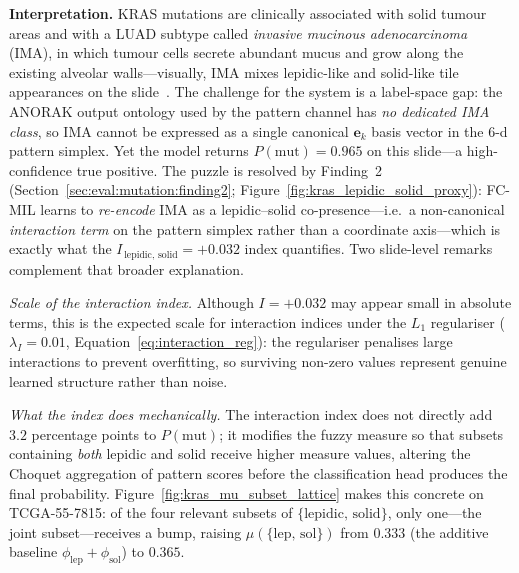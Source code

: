\textbf{Interpretation.}
KRAS mutations are clinically associated with solid tumour areas
and with a LUAD subtype called
\emph{invasive mucinous adenocarcinoma} (IMA), in which tumour
cells secrete abundant mucus and grow along the existing
alveolar walls---visually, IMA mixes lepidic-like and solid-like
tile appearances on the slide~\cite{shim2015krasmucinous}.
The challenge for the system is a label-space gap: the ANORAK
output ontology used by the pattern channel has \emph{no
dedicated IMA class}, so IMA cannot be expressed as a single
canonical $\mathbf{e}_k$ basis vector in the 6-d pattern simplex.
Yet the model returns $P(\text{mut}) = 0.965$ on this slide---a
high-confidence true positive.
The puzzle is resolved by Finding~2
(Section~\ref{sec:eval:mutation:finding2};
Figure~\ref{fig:kras_lepidic_solid_proxy}): FC-MIL learns to
\emph{re-encode} IMA as a lepidic--solid co-presence---i.e.\ a
non-canonical \emph{interaction term} on the pattern simplex
rather than a coordinate axis---which is exactly what the
$I_{\,\mathrm{lepidic,\,solid}} = +0.032$ index quantifies.
Two slide-level remarks complement that broader explanation.

\emph{Scale of the interaction index.}
Although $I = +0.032$ may appear small in absolute terms, this is
the expected scale for interaction indices under the $L_1$
regulariser ($\lambda_I = 0.01$,
Equation~\ref{eq:interaction_reg}): the regulariser penalises large
interactions to prevent overfitting, so surviving non-zero values
represent genuine learned structure rather than noise.

\emph{What the index does mechanically.}
The interaction index does not directly add $3.2$ percentage points
to $P(\text{mut})$; it modifies the fuzzy measure so that subsets
containing \emph{both} lepidic and solid receive higher measure
values, altering the Choquet aggregation of pattern scores before
the classification head produces the final probability.
Figure~\ref{fig:kras_mu_subset_lattice} makes this concrete on
TCGA-55-7815: of the four relevant subsets of
$\{\mathrm{lepidic},\,\mathrm{solid}\}$, only one---the joint
subset---receives a bump, raising
$\mu(\{\mathrm{lep,\,sol}\})$ from $0.333$ (the additive baseline
$\phi_{\mathrm{lep}} + \phi_{\mathrm{sol}}$) to $0.365$.

